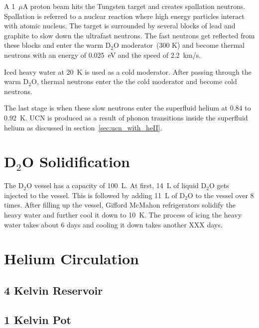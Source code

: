 A 1~$\mu$A proton beam hits the Tungsten target and creates spallation
neutrons.  Spallation is referred to a nuclear reaction where high
energy particles interact with atomic nucleus.  The target is
surrounded by several blocks of lead and graphite to slow down the
ultrafast neutrons. The fast neutrons get reflected from these blocks and
enter the warm D$_2$O moderator~(300 K) and become thermal neutrons
with an energy of 0.025~eV and the speed of 2.2~km/s.

Iced heavy water at 20~K is used as a cold moderator. After passing
through the warm D$_2$O, thermal neutrons enter the the cold moderator
and become cold neutrons.

The last stage is when these slow neutrons enter the superfluid helium
at 0.84 to 0.92~K. UCN is produced as a result of phonon transitions
inside the superfluid helium as discussed in section~\ref{sec:ucn_with_heII}.


\section{D$_2$O Solidification}
The D$_2$O vessel has a capacity of 100~L. At first, 14~L of liquid
D$_2$O gets injected to the vessel. This is followed by adding 11~L of
D$_2$O to the vessel over 8 times.
After filling up the vessel, Gifford McMahon refrigerators solidify the heavy water and further cool it down to 10~K. The process of icing the heavy water takes about 6 days and cooling it down takes another XXX days.


\section{Helium Circulation}

\subsection{4 Kelvin Reservoir}

\subsection{1 Kelvin Pot}

